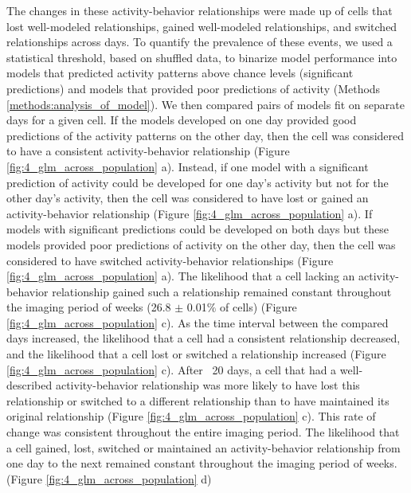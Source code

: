 The changes in these activity-behavior relationships were made up of cells that lost well-modeled relationships, gained well-modeled relationships, and switched relationships across days. To quantify the prevalence of these events, we used a statistical threshold, based on shuffled data, to binarize model performance into models that predicted activity patterns above chance levels (significant predictions) and models that provided poor predictions of activity (Methods \ref{methods:analysis_of_model}). We then compared pairs of models fit on separate days for a given cell. If the models developed on one day provided good predictions of the activity patterns on the other day, then the cell was considered to have a consistent activity-behavior relationship (Figure \ref{fig:4_glm_across_population} a). Instead, if one model with a significant prediction of activity could be developed for one day's activity but not for the other day's activity, then the cell was considered to have lost or gained an activity-behavior relationship (Figure \ref{fig:4_glm_across_population} a). If models with significant predictions could be developed on both days but these models provided poor predictions of activity on the other day, then the cell was considered to have switched activity-behavior relationships (Figure \ref{fig:4_glm_across_population} a). The likelihood that a cell lacking an activity-behavior relationship gained such a relationship remained constant throughout the imaging period of weeks (26.8 $\pm$ 0.01$\%$ of cells) (Figure \ref{fig:4_glm_across_population} c). As the time interval between the compared days increased, the likelihood that a cell had a consistent relationship decreased, and the likelihood that a cell lost or switched a relationship increased (Figure \ref{fig:4_glm_across_population} c). After ~20 days, a cell that had a well-described activity-behavior relationship was more likely to have lost this relationship or switched to a different relationship than to have maintained its original relationship (Figure \ref{fig:4_glm_across_population} c). This rate of change was consistent throughout the entire imaging period. The likelihood that a cell gained, lost, switched or maintained an activity-behavior relationship from one day to the next remained constant throughout the imaging period of weeks. (Figure \ref{fig:4_glm_across_population} d)

